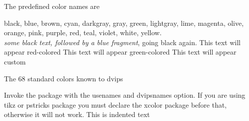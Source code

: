 \documentclass[11pt,a4paper,english]{article}
\begin{document}
The predefined color names are

black, blue, brown, cyan, darkgray, gray, green, lightgray, 
lime, magenta, olive, orange, 
pink, purple, red, teal, violet, white, yellow.\\

\pagecolor{LightGoldenrod} %
\emph{some black text, \color{blue} followed by a blue fragment}, going black again.
{\color[rgb]{1,0,0} This text will appear red-colored}
\textcolor[rgb]{0,1,0}{This text will appear green-colored}
\textcolor[rgb]{0.1,0.40,0.03}{This text will appear custom}

The 68 standard colors known to dvips

Invoke the package with the usenames and dvipsnames option. 
If you are using tikz or pstricks package you must declare the xcolor 
package before that, otherwise it will not work.
\indent This is indented text
\end{document}
